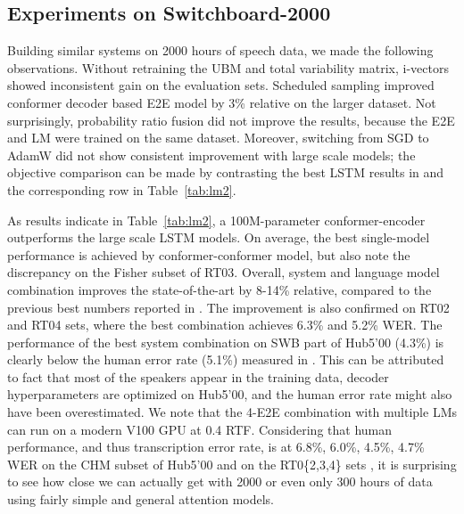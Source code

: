 \documentclass[a4paper]{article}
\begin{document}
\subsection{Experiments on Switchboard-2000}
\vspace{-.5mm}
Building similar systems on 2000 hours of speech data, we made the following observations.
Without retraining the UBM and total variability matrix, i-vectors showed inconsistent gain on the evaluation sets.
Scheduled sampling improved conformer decoder based  E2E model by 3\% relative on the larger dataset.
Not surprisingly, probability ratio fusion did not improve the results, because the E2E and LM were trained on the same dataset.
Moreover, switching from SGD to AdamW did not show consistent improvement with large scale models; the objective comparison can be made by contrasting the best LSTM results in \cite{Tuske2020} and the corresponding row in Table~\ref{tab:lm2}.

As results indicate in Table~\ref{tab:lm2}, a 100M-parameter conformer-encoder outperforms the large scale LSTM models.
On average, the best single-model performance is achieved by conformer-conformer model, but also note the discrepancy on the Fisher subset of RT03.
Overall, system and language model combination improves the state-of-the-art by 8-14\% relative, compared to the previous best numbers reported in \cite{Tuske2020}.
The improvement is also confirmed on RT02 and RT04 sets, where the best combination achieves 6.3\% and 5.2\% WER.
The performance of the best system combination on SWB part of Hub5'00 (4.3\%) is clearly below the human error rate (5.1\%) measured in \cite{Saon2017}.
This can be attributed to fact that most of the speakers appear in the training data, decoder hyperparameters are optimized on Hub5'00, and the human error rate might also have been overestimated.
We note that the 4-E2E combination with multiple LMs can run on a modern V100 GPU at 0.4 RTF.
Considering that human performance, and thus transcription error rate, is at 6.8\%, 6.0\%, 4.5\%, 4.7\% WER on the CHM subset of Hub5'00 and on the RT0\{2,3,4\} sets \cite{Saon2017}, it is surprising to see how close we can actually get with 2000 or even only 300 hours of data using fairly simple and general attention models.

\vspace{-1mm}
\end{document}
